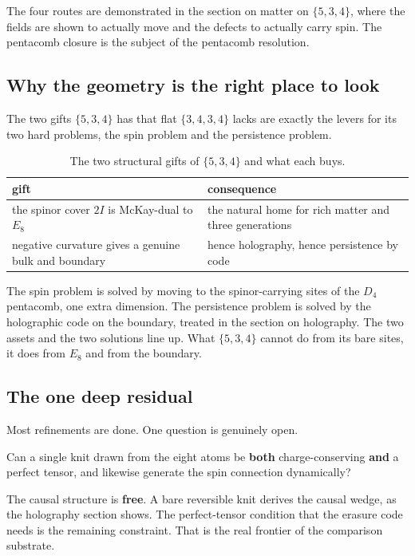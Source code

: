 The four routes are demonstrated in the section on matter on $\{5,3,4\}$, where the fields are shown to actually
move and the defects to actually carry spin. The pentacomb closure is the subject of the pentacomb resolution.

\subsection{Why the geometry is the right place to look}

The two gifts $\{5,3,4\}$ has that flat $\{3,4,3,4\}$ lacks are exactly the levers for its two hard problems, the
spin problem and the persistence problem.

\begin{table}[ht]
\centering
\begin{tabular}{@{}p{}p{}@{}}
\toprule
gift & consequence \\
\midrule
the spinor cover $2I$ is McKay-dual to $E_8$ & the natural home for rich matter and three generations \\
negative curvature gives a genuine bulk and boundary & hence holography, hence persistence by code \\
\bottomrule
\end{tabular}
\caption{The two structural gifts of $\{5,3,4\}$ and what each buys.}
\label{tab:534-gifts}
\end{table}

The spin problem is solved by moving to the spinor-carrying sites of the $D_4$ pentacomb, one extra dimension.
The persistence problem is solved by the holographic code on the boundary, treated in the section on holography.
The two assets and the two solutions line up. What $\{5,3,4\}$ cannot do from its bare sites, it does from $E_8$
and from the boundary.

\subsection{The one deep residual}

Most refinements are done. One question is genuinely open.

\begin{principle}
Can a single knit drawn from the eight atoms be \textbf{both} charge-conserving \textbf{and} a perfect tensor,
and likewise generate the spin connection dynamically?
\end{principle}

The causal structure is \textbf{free}. A bare reversible knit derives the causal wedge, as the holography section
shows. The perfect-tensor condition that the erasure code needs is the remaining constraint. That is the real
frontier of the comparison substrate.

